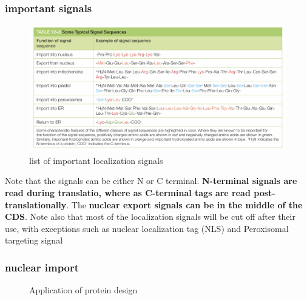\documentclass[../main.tex]{subfiles}
\begin{document}
\subsubsection{important signals}
\begin{figure}[H]
    \centering
    \includegraphics[width=\linewidth]{ImportantSignals.png}
    \caption{list of important localization signals}
    \label{fig:enter-label}
\end{figure}
Note that the signals can be either N or C terminal.\textbf{ N-terminal signals are read during translatio, where as C-terminal tags are read post-translationally}. The \textbf{nuclear export signals can be in the middle of the CDS}. Note also that most of the localization signals will be cut off after their use, with exceptions such as nuclear localization tag (\gls{NLS}) and Peroxisomal targeting signal

\subsubsection{nuclear import}


\begin{figure}[H]
    \centering
    \hspace{0.05\textwidth} %
    \caption{Application of protein design}
    \label{fig:ITC_all}
\end{figure}
\end{document}
